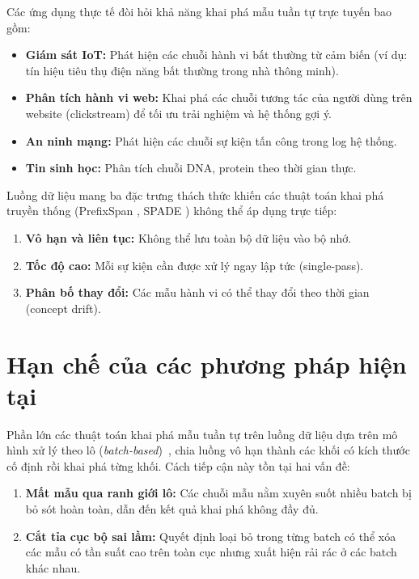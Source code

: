 \documentclass[14pt,a4paper,oneside]{extreport}
\begin{document}
Các ứng dụng thực tế đòi hỏi khả năng khai phá mẫu tuần tự trực tuyến bao gồm:
\begin{itemize}
    \item \textbf{Giám sát IoT:} Phát hiện các chuỗi hành vi bất thường từ cảm biến (ví dụ: tín hiệu tiêu thụ điện năng bất thường trong nhà thông minh).
    \item \textbf{Phân tích hành vi web:} Khai phá các chuỗi tương tác của người dùng trên website (clickstream) để tối ưu trải nghiệm và hệ thống gợi ý.
    \item \textbf{An ninh mạng:} Phát hiện các chuỗi sự kiện tấn công trong log hệ thống.
    \item \textbf{Tin sinh học:} Phân tích chuỗi DNA, protein theo thời gian thực.
\end{itemize}

Luồng dữ liệu mang ba đặc trưng thách thức khiến các thuật toán khai phá truyền thống (PrefixSpan \cite{pei2001}, SPADE \cite{zaki2001}) không thể áp dụng trực tiếp:
\begin{enumerate}
    \item \textbf{Vô hạn và liên tục:} Không thể lưu toàn bộ dữ liệu vào bộ nhớ.
    \item \textbf{Tốc độ cao:} Mỗi sự kiện cần được xử lý ngay lập tức (single-pass).
    \item \textbf{Phân bố thay đổi:} Các mẫu hành vi có thể thay đổi theo thời gian (concept drift).
\end{enumerate}

\section{Hạn chế của các phương pháp hiện tại}
Phần lớn các thuật toán khai phá mẫu tuần tự trên luồng dữ liệu dựa trên mô hình xử lý theo lô (\textit{batch-based})~\cite{marascu2006, ho2005}, chia luồng vô hạn thành các khối có kích thước cố định rồi khai phá từng khối. Cách tiếp cận này tồn tại hai vấn đề:

\begin{enumerate}
    \item \textbf{Mất mẫu qua ranh giới lô:} Các chuỗi mẫu nằm xuyên suốt nhiều batch bị bỏ sót hoàn toàn, dẫn đến kết quả khai phá không đầy đủ.
    \item \textbf{Cắt tỉa cục bộ sai lầm:} Quyết định loại bỏ trong từng batch có thể xóa các mẫu có tần suất cao trên toàn cục nhưng xuất hiện rải rác ở các batch khác nhau.
\end{enumerate}
\end{document}
